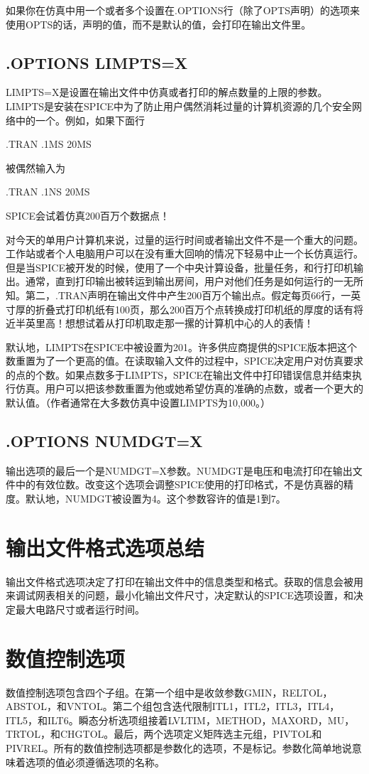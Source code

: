 如果你在仿真中用一个或者多个设置在.OPTIONS行（除了OPTS声明）的选项来使用OPTS的话，声明的值，而不是默认的值，会打印在输出文件里。

\subsection{.OPTIONS LIMPTS=X}
LIMPTS=X是设置在输出文件中仿真或者打印的解点数量的上限的参数。LIMPTS是安装在SPICE中为了防止用户偶然消耗过量的计算机资源的几个安全网络中的一个。例如，如果下面行

.TRAN .1MS 20MS

被偶然输入为

.TRAN .1NS 20MS

SPICE会试着仿真200百万个数据点！

对今天的单用户计算机来说，过量的运行时间或者输出文件不是一个重大的问题。工作站或者个人电脑用户可以在没有重大回响的情况下轻易中止一个长仿真运行。但是当SPICE被开发的时候，使用了一个中央计算设备，批量任务，和行打印机输出。通常，直到打印输出被转运到输出房间，用户对他们任务是如何运行的一无所知。第二，.TRAN声明在输出文件中产生200百万个输出点。假定每页66行，一英寸厚的折叠式打印机纸有100页，那么200百万个点转换成打印机纸的厚度的话有将近半英里高！想想试着从打印机取走那一摞的计算机中心的人的表情！

默认地，LIMPTS在SPICE中被设置为201。许多供应商提供的SPICE版本把这个数重置为了一个更高的值。在读取输入文件的过程中，SPICE决定用户对仿真要求的点的个数。如果点数多于LIMPTS，SPICE在输出文件中打印错误信息并结束执行仿真。用户可以把该参数重置为他或她希望仿真的准确的点数，或者一个更大的默认值。（作者通常在大多数仿真中设置LIMPTS为10,000。）

\subsection{.OPTIONS NUMDGT=X}
输出选项的最后一个是NUMDGT=X参数。NUMDGT是电压和电流打印在输出文件中的有效位数。改变这个选项会调整SPICE使用的打印格式，不是仿真器的精度。默认地，NUMDGT被设置为4。这个参数容许的值是1到7。

\section{输出文件格式选项总结}
输出文件格式选项决定了打印在输出文件中的信息类型和格式。获取的信息会被用来调试网表相关的问题，最小化输出文件尺寸，决定默认的SPICE选项设置，和决定最大电路尺寸或者运行时间。

\section{数值控制选项}
数值控制选项包含四个子组。在第一个组中是收敛参数GMIN，RELTOL，ABSTOL，和VNTOL。第二个组包含迭代限制ITL1，ITL2，ITL3，ITL4，ITL5，和ILT6。瞬态分析选项组接着LVLTIM，METHOD，MAXORD，MU，TRTOL，和CHGTOL。最后，两个选项定义矩阵选主元组，PIVTOL和PIVREL。所有的数值控制选项都是参数化的选项，不是标记。参数化简单地说意味着选项的值必须遵循选项的名称。

